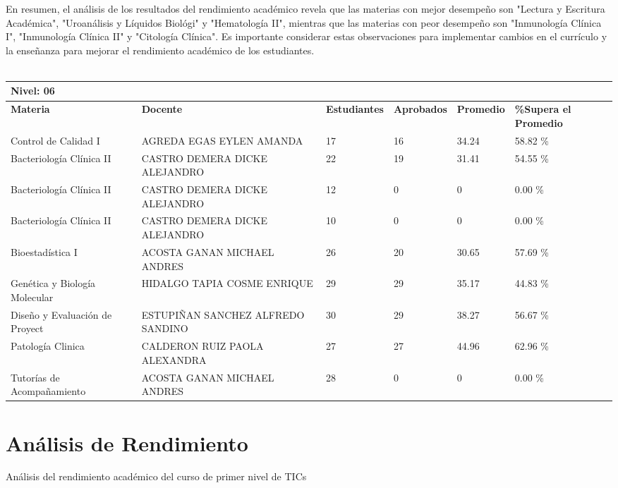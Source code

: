 En resumen, el análisis de los resultados del rendimiento académico revela que las materias con mejor desempeño son "Lectura y Escritura Académica", "Uroanálisis y Líquidos Biológi" y "Hematología II", mientras que las materias con peor desempeño son "Inmunología Clínica I", "Inmunología Clínica II" y "Citología Clínica". Es importante considerar estas observaciones para implementar cambios en el currículo y la enseñanza para mejorar el rendimiento académico de los estudiantes.\\
\vspace{1cm}\\\small
\begin{tabularx}{\textwidth}{|p{2.5cm}|p{2.5cm}|X|X|X|X|}
\hline
\multicolumn{6}{|X|}{\textbf{Nivel: 06 }}\\\hline\textbf{Materia} & \textbf{Docente} & \textbf{Estudiantes} & \textbf{Aprobados} & \textbf{Promedio} & \textbf{\%Supera el Promedio} \\ \hline
Control de Calidad I & AGREDA EGAS EYLEN AMANDA & 17 & 16 & 34.24 & 58.82 \%\\ \hline
Bacteriología Clínica II & CASTRO DEMERA DICKE ALEJANDRO & 22 & 19 & 31.41 & 54.55 \%\\ \hline
Bacteriología Clínica II & CASTRO DEMERA DICKE ALEJANDRO & 12 & 0 & 0 & 0.00 \%\\ \hline
Bacteriología Clínica II & CASTRO DEMERA DICKE ALEJANDRO & 10 & 0 & 0 & 0.00 \%\\ \hline
Bioestadística I & ACOSTA GANAN MICHAEL ANDRES & 26 & 20 & 30.65 & 57.69 \%\\ \hline
Genética y Biología Molecular & HIDALGO TAPIA COSME ENRIQUE & 29 & 29 & 35.17 & 44.83 \%\\ \hline
Diseño y Evaluación de Proyect & ESTUPIÑAN SANCHEZ ALFREDO SANDINO & 30 & 29 & 38.27 & 56.67 \%\\ \hline
Patología Clinica & CALDERON RUIZ PAOLA ALEXANDRA & 27 & 27 & 44.96 & 62.96 \%\\ \hline
Tutorías de Acompañamiento & ACOSTA GANAN MICHAEL ANDRES & 28 & 0 & 0 & 0.00 \%\\ \hline
\end{tabularx}

\vspace{1cm}
\section{Análisis de Rendimiento}
Análisis del rendimiento académico del curso de primer nivel de TICs

